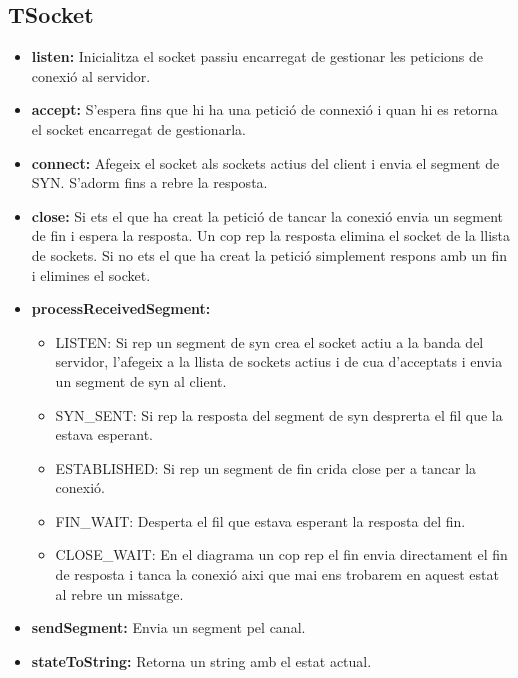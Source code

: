 \documentclass[12pt, a4papre]{article}
\begin{document}
	\subsection{TSocket}
	
	\begin{itemize}
		\item  \textbf{listen:} Inicialitza el socket passiu encarregat de gestionar les peticions de conexió al servidor.
		\item  \textbf{accept:} S'espera fins que hi ha una petició de connexió i quan hi es retorna el socket encarregat de gestionarla.
		\item  \textbf{connect:} Afegeix el socket als sockets actius del client i envia el segment de SYN. S'adorm fins a rebre la resposta.
		\item  \textbf{close:} Si ets el que ha creat la petició de tancar la conexió envia un segment de fin i espera la resposta. Un cop rep la resposta elimina el socket de la llista de sockets. Si no ets el que ha creat la petició simplement respons amb un fin i elimines el socket.
		\item  \textbf{processReceivedSegment:} 
		\begin{itemize}
			\item LISTEN: Si rep un segment de syn crea el socket actiu a la banda del servidor, l'afegeix a la llista de sockets actius i de cua d'acceptats i envia un segment de syn al client.
			\item SYN\_SENT: Si rep la resposta del segment de syn desprerta el fil que la estava esperant.
			\item ESTABLISHED: Si rep un segment de fin crida close per a tancar la conexió.
			\item FIN\_WAIT: Desperta el fil que estava esperant la resposta del fin.
			\item CLOSE\_WAIT: En el diagrama un cop rep el fin envia directament el fin de resposta i tanca la conexió aixi que mai ens trobarem en aquest estat al rebre un missatge.
		\end{itemize}
		\item  \textbf{sendSegment:} Envia un segment pel canal.
		\item  \textbf{stateToString:} Retorna un string amb el estat actual.
	\end{itemize}
	

	
	
\end{document}
